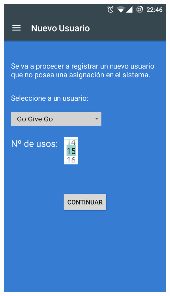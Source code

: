 \documentclass[../PFC.tex]{subfiles}
\begin{document}
\begin{figure}[H]
\centering
	\begin{subfigure}{0.32\textwidth}
		\centering
		\includegraphics[width=0.95\textwidth]{./img/app/nuevoUsuario}
    \end{subfigure} 
	\begin{subfigure}{0.32\textwidth}
		\centering

\end{subfigure}
\end{figure}
\end{document}
